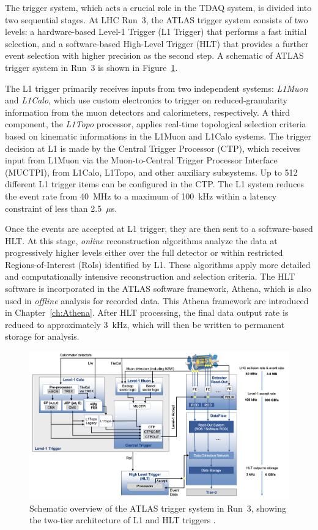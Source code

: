 The trigger system, which acts a crucial role in the TDAQ system, is divided into two sequential stages. At LHC Run~3, the ATLAS trigger system consists of two levels: a hardware-based Level-1 Trigger (L1 Trigger) that performs a fast initial selection, and a software-based High-Level Trigger (HLT) that provides a further event selection with higher precision as the second step. A schematic of ATLAS trigger system in Run~3 is shown in Figure~\ref{fig:trigger_run3}.

The L1 trigger primarily receives inputs from two independent systems: \textit{L1Muon} and \textit{L1Calo}, which use custom electronics to trigger on reduced-granularity information from the muon detectors and calorimeters, respectively. A third component, the \textit{L1Topo} processor, applies real-time topological selection criteria based on kinematic informations in the L1Muon and L1Calo systems. The trigger decision at L1 is made by the Central Trigger Processor (CTP), which receives input from L1Muon via the Muon-to-Central Trigger Processor Interface (MUCTPI), from L1Calo, L1Topo, and other auxiliary subsystems. Up to 512 different L1 trigger items can be configured in the CTP. The L1 system reduces the event rate from 40~MHz to a maximum of 100~kHz within a latency constraint of less than 2.5~$\mu$s. 

Once the events are accepted at L1 trigger, they are then sent to a software-based HLT. At this stage, \textit{online} reconstruction algorithms analyze the data at progressively higher levels either over the full detector or within restricted Regions-of-Interest (RoIs) identified by L1. These algorithms apply more detailed and computationally intensive reconstruction and selection criteria. The HLT software is incorporated in the ATLAS software framework, Athena, which is also used in \textit{offline} analysis for recorded data. This Athena framework are introduced in Chapter~\ref{ch:Athena}. After HLT processing, the final data output rate is reduced to approximately 3~kHz, which will then be written to permanent storage for analysis.

\begin{figure}[htbp]
  \centering
  \includegraphics[width=1.0\textwidth]{figs/chapter2/trigger_run3_1.png}
  \caption{Schematic overview of the ATLAS trigger system in Run~3, showing the two-tier architecture of L1 and HLT triggers \cite{ATLASRun3Trigger}.}
  \label{fig:trigger_run3}
\end{figure}

